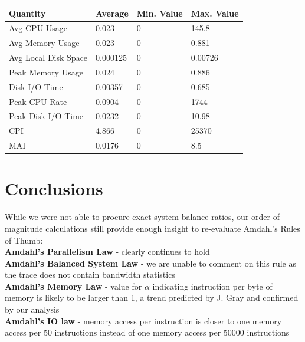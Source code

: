 \documentclass[a0,portrait]{a0poster}
\begin{document}
\begin{multicols}{2}
\begin{center}\vspace{1cm}
\begin{tabular}{| l | l l l |} 
\toprule
\textbf{Quantity} & \textbf{Average} & \textbf{Min. Value} & \textbf{Max. Value} \\
\midrule
Avg CPU Usage & 0.023 & 0 & 145.8 \\ \hline
Avg Memory Usage & 0.023 & 0 & 0.881 \\ \hline
Avg Local Disk Space & 0.000125 & 0 & 0.00726 \\ \hline
Peak Memory Usage & 0.024 & 0 & 0.886 \\ \hline
Disk I/O Time & 0.00357 & 0 & 0.685 \\ \hline
Peak CPU Rate & 0.0904 & 0 & 1744\* \\ \hline
Peak Disk I/O Time & 0.0232 & 0 & 10.98 \\ \hline
CPI & 4.866 & 0 & 25370\* \\ \hline
MAI & 0.0176 & 0 & 8.5\* \\ \hline
\bottomrule
\end{tabular}
\end{center}\vspace{1cm}



\color{SaddleBrown} %

\section*{Conclusions}

While we were not able to procure exact system balance ratios, our order of magnitude calculations still provide enough insight to re-evaluate Amdahl's Rules of Thumb: \\

\noindent \textbf{Amdahl's Parallelism Law} - clearly continues to hold \\
\textbf{Amdahl's Balanced System Law} - we are unable to comment on this rule as the trace does not contain bandwidth statistics\\
\textbf{Amdahl's Memory Law} - value for $\alpha$ indicating instruction per byte of memory is likely to be larger than 1, a trend predicted by J. Gray  and confirmed by our analysis\\
\textbf{Amdahl's IO law} - memory access per instruction is closer to one memory access per 50 instructions instead of one memory access per 50000 instructions \\


\end{multicols}
\end{document}
